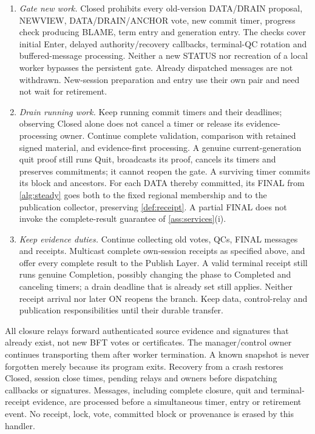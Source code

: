 \documentclass[11pt,a4paper]{article}
\begin{document}
\begin{enumerate}[label=(\roman*),itemsep=2pt]
duplicate, or returning a Terminated/tombstone result. Historical
context is validated without requiring that the old version remain
open. Complete proposals from correct voters carry or resolve this
context within the complete-message bound. This handler is
mandatory even if the old worker was never created, its ReadyBundle
is refused, or a delayed callback arrives after exit or restart.
\item \emph{Gate new work.} Closed prohibits every old-version
DATA/DRAIN proposal, NEWVIEW, DATA/DRAIN/ANCHOR vote, new commit timer,
progress check producing BLAME, term entry and generation entry.
The checks cover initial Enter, delayed authority/recovery callbacks,
terminal-QC rotation and buffered-message processing. Neither a new
STATUS nor recreation of a local worker bypasses the persistent gate.
Already dispatched messages are not withdrawn. New-session preparation
and entry use their own pair and need not wait for retirement.
\item \emph{Drain running work.} Keep running commit timers and
their deadlines; observing Closed alone does not cancel a
timer or release its evidence-processing owner. Continue complete
validation, comparison with retained signed material, and evidence-first
processing. A genuine current-generation quit proof still runs Quit,
broadcasts its proof, cancels its timers and preserves commitments;
it cannot reopen the gate. A surviving timer commits its block and
ancestors. For each DATA thereby committed, its FINAL from \cref{alg:steady} goes
both to the fixed regional membership and to the publication collector,
preserving \cref{def:receipt}. A partial FINAL does not invoke the
complete-result guarantee of \cref{ass:services}(i).
\item \emph{Keep evidence duties.} Continue collecting old votes, QCs,
FINAL messages and receipts. Multicast complete own-session receipts
as specified above, and offer every complete result to the Publish
Layer. A valid terminal receipt still runs genuine Completion,
possibly changing the phase to Completed and canceling timers; a
drain deadline that is already set still applies. Neither receipt arrival nor
later ON reopens the branch. Keep data, control-relay and publication
responsibilities until their durable transfer.
\end{enumerate}
All closure relays forward authenticated source evidence and
signatures that already exist, not new BFT votes or certificates. The manager/control owner
continues transporting them after worker termination. A known snapshot
is never forgotten merely because its program exits. Recovery from a
crash restores Closed, session close times, pending relays and owners
before dispatching callbacks or signatures. Messages, including complete
closure, quit and terminal-receipt evidence, are processed before a
simultaneous timer, entry or retirement event. No receipt, lock, vote,
committed block or provenance is erased by this handler.
\end{document}
